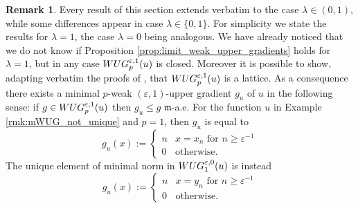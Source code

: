 \documentclass[12pt]{amsart}
\newcommand{\mm}{\mathfrak m}
\theoremstyle{definition}
\newtheorem{remark}[theorem]{Remark}
\newcommand{\WUG}[2]{{\rm WUG}_{#1}^{#2}}
\begin{document}
\begin{remark}
    Every result of this section extends verbatim to the case $\lambda \in (0,1)$, while some differences appear in case $\lambda \in \{0,1\}$. For simplicity we state the results for $\lambda = 1$, the case $\lambda = 0$ being analogous. We have already noticed that we do not know if Proposition \ref{prop:limit_weak_upper_gradients} holds for $\lambda = 1$, but in any case $\WUG{p}{\varepsilon,1}(u)$ is closed. Moreover it is possible to show, adapting verbatim the proofs of \cite[Lemma 6.3.8]{HKST15}, that $\WUG{p}{\varepsilon,1}(u)$ is a lattice. As a consequence there exists a minimal $p$-weak $(\varepsilon,1)$-upper gradient $g_u$ of $u$ in the following sense: if $g\in \WUG{p}{\varepsilon, 1}(u)$ then $g_u \le g$ $\mm$-a.e. For the function $u$ in Example \ref{rmk:mWUG_not_unique} and $p=1$, then $g_u$ is equal to
    \begin{equation*}
        g_{u}(x) := \begin{cases}
            n & x=x_n \text{ for }n \ge \varepsilon^{-1}\\
            0 & \text{otherwise.}
        \end{cases}
    \end{equation*}
    The unique element of minimal norm in $\WUG{1}{\varepsilon, 0}(u)$ is instead
    \begin{equation*}
        g_u(x) := \begin{cases}
            n & x=y_n \text{ for }n \ge \varepsilon^{-1}\\
            0 & \text{otherwise.}
        \end{cases}
    \end{equation*}
\end{remark}
\end{document}
